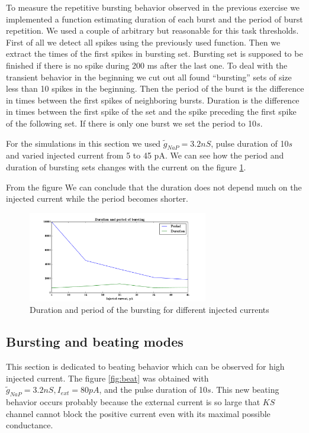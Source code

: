 \documentclass[a4paper,11pt]{article} %
\begin{document}
To measure the repetitive bursting behavior observed in the previous exercise
we implemented a function estimating duration of each burst and the period of
burst repetition. We used a couple of arbitrary but reasonable for this task thresholds.
First of all we detect all spikes using the previously used function. Then we 
extract the times of the first spikes in bursting set.
Bursting set is supposed to be finished if there is no spike during 200 ms after the last one.
To deal with the transient behavior in the beginning we cut out all found ``bursting'' sets of size
less than 10 spikes in the beginning. Then the period of the burst is the difference in times
between the first spikes of neighboring bursts. Duration is the difference in times between the
first spike of the set and the spike preceding the first spike of the following set.
If there is only one burst we set the period to 10$s$.

For the simulations in this section we used $\tilde{g}_{NaP} = 3.2nS$, pulse
duration of 10$s$ and varied injected current from 5 to 45 pA.
We can see how the period and duration of bursting sets changes with 
the current on the figure \ref{fig:bdur_bper}.

From the figure We can conclude that the duration does not depend much on the
injected current while the period becomes shorter.

\begin{figure}[H]
    \centering
    \includegraphics[width=0.7\textwidth]{bduration_bperiod}
    \caption{Duration and period of the bursting for different injected currents}
    \label{fig:bdur_bper}
\end{figure}

\subsection{Bursting and beating modes}

This section is dedicated to beating behavior which
can be observed for high injected current. The figure \ref{fig:beat} was obtained
with $\tilde{g}_{NaP} = 3.2nS, I_{ext} = 80pA$, and the pulse duration of 10$s$.
This new beating behavior occurs probably because the external current is so
large that $KS$ channel cannot block the positive current even with
its maximal possible conductance. 
\end{document}
